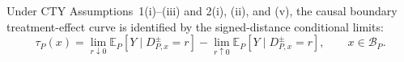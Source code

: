 Under CTY Assumptions~1(i)--(iii) and 2(i), (ii), and (v), the causal boundary treatment-effect curve is identified by the signed-distance conditional limits:
\[
 \tau_P(x)=\lim_{r\downarrow0}\mathbb E_P[Y\mid D^{\pm}_{P,x}=r]
 -\lim_{r\uparrow0}\mathbb E_P[Y\mid D^{\pm}_{P,x}=r],
 \qquad x\in\mathcal B_P.
\]